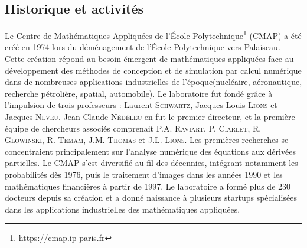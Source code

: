 \subsection{Historique et activités}
Le Centre de Mathématiques Appliquées de l'École Polytechnique\footnote{\href{https://cmap.ip-paris.fr}{https://cmap.ip-paris.fr}} (CMAP) a été créé en 1974 lors du déménagement de l'École Polytechnique vers Palaiseau. 
Cette création répond au besoin émergent de mathématiques appliquées face au développement des méthodes de conception et de simulation par calcul numérique dans de nombreuses applications industrielles de l'époque(nucléaire, aéronautique, recherche pétrolière, spatial, automobile).
Le laboratoire fut fondé grâce à l'impulsion de trois professeurs : Laurent \textsc{Schwartz}, Jacques-Louis \textsc{Lions} et Jacques \textsc{Neveu}. Jean-Claude \textsc{Nédélec} en fut le premier directeur, et la première équipe de chercheurs associés comprenait P.A. \textsc{Raviart}, P. \textsc{Ciarlet}, R. \textsc{Glowinski}, R. \textsc{Temam}, J.M. \textsc{Thomas} et J.L. \textsc{Lions}. 
Les premières recherches se concentraient principalement sur l'analyse numérique des équations aux dérivées partielles.
Le CMAP s'est diversifié au fil des décennies, intégrant notamment les probabilités dès 1976, puis le traitement d'images dans les années 1990 et les mathématiques financières à partir de 1997. 
Le laboratoire a formé plus de 230 docteurs depuis sa création et a donné naissance à plusieurs startups spécialisées dans les applications industrielles des mathématiques appliquées.

